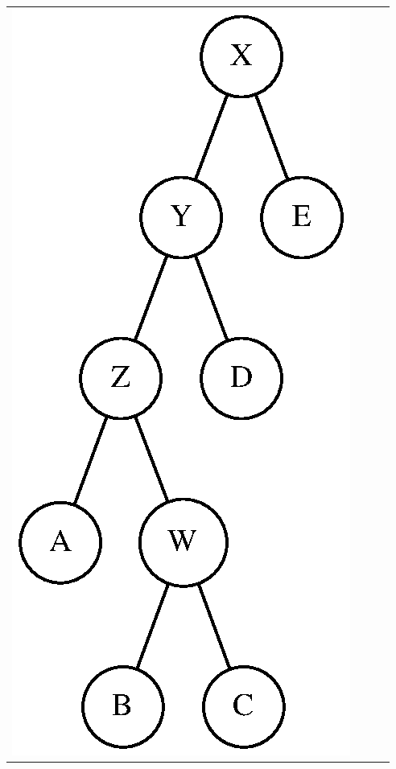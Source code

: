 \documentclass[aspectratio=169]{beamer}
\begin{document}
\begin{frame}[fragile]
\begin{enumerate}
\begin{tabular}{llll}
\includegraphics[height=0.5\paperheight]{imagens/arvore_binaria05.eps} &

\end{tabular}
\end{enumerate}
\end{frame}
\end{document}
